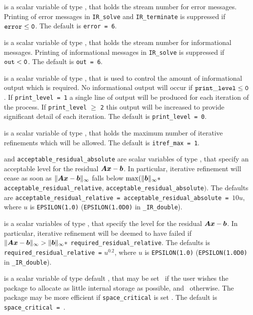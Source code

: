\documentclass{galahad}
\newcommand{\packagename}{IR}
\newcommand{\fullpackagename}{\libraryname\_\-\packagename}
\begin{document}
\begin{description}
 is a scalar variable of type \integer, that holds the
stream number for error messages.
Printing of error messages in
{\tt \packagename\_solve} and {\tt \packagename\_terminate}
is suppressed if ${\tt error} \leq {\tt 0}$.
The default is {\tt error = 6}.

 is a scalar variable of type \integer, that holds the
stream number for informational messages.
Printing of informational messages in
{\tt \packagename\_solve} is suppressed if ${\tt out} < {\tt 0}$.
The default is {\tt out = 6}.

 is a scalar variable of type \integer,
that is used
to control the amount of informational output which is required. No
informational output will occur if ${\tt print\_level} \leq {\tt 0}$. If
{\tt print\_level = 1} a single line of output will be produced for each
iteration of the process. If {\tt print\_level} $\geq$ {\tt 2} this output
will be increased to provide significant detail of each iteration.
The default is {\tt print\_level = 0}.

 is a scalar variable of type \integer, that holds
the maximum number of iterative refinements which will be allowed.
The default is {\tt itref\_max = 1}.

  and {\tt acceptable\_residual\_absolute}
are scalar variables of type \realdp, that
specify an acceptable level for the residual ${\bm{A}} {\bm{x}} - {\bm{b}}$.
In particular, iterative refinement will cease as soon as
$\|{\bm{A}} {\bm{x}} - {\bm{b}}\|_{\infty}$ falls below
$\max (\| {\bm{b}}\|_{\infty} \ast$ {\tt acceptable\_residual\_relative},
{\tt acceptable\_residual\_absolute}$)$.
The defaults are {\tt acceptable\_residual\_relative =}{\tt
acceptable\_resi\-dual\_absolute = }$10 u$,
where $u$ is {\tt EPSILON(1.0)} ({\tt EPSILON(1.0D0)} in
{\tt \fullpackagename\_double}).

 is a scalar variables of type \realdp, that
specify the level for the residual ${\bm{A}} {\bm{x}} - {\bm{b}}$.
In particular, iterative refinement will be deemed to have failed if
$\|{\bm{A}} {\bm{x}} - {\bm{b}}\|_{\infty} >
 \| {\bm{b}}\|_{\infty} \ast$ {\tt required\_residual\_relative}.
The defaults is {\tt required\_residual\_relative =} $u^{0.2}$,
where $u$ is {\tt EPSILON(1.0)} ({\tt EPSILON(1.0D0)} in
{\tt \fullpackagename\_double}).

 is a scalar variable of type default \logical, that
may be set \true\ if the user wishes the package to allocate as little
internal storage as possible, and \false\ otherwise. The package may
be more efficient if {\tt space\_critical} is set \false.
The default is {\tt space\_critical = \false}.


\end{description}
\end{document}

